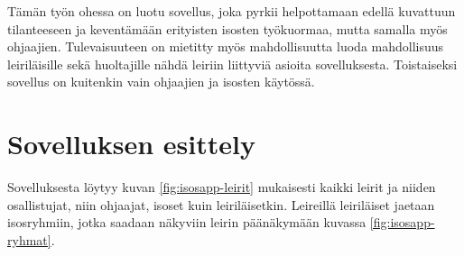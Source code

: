 Tämän työn ohessa on luotu sovellus, joka pyrkii helpottamaan edellä kuvattuun
tilanteeseen ja keventämään erityisten isosten työkuormaa, mutta samalla myös
ohjaajien. Tulevaisuuteen on mietitty myös mahdollisuutta luoda mahdollisuus
leiriläisille sekä huoltajille nähdä leiriin liittyviä asioita sovelluksesta.
Toistaiseksi sovellus on kuitenkin vain ohjaajien ja isosten käytössä.

\section{Sovelluksen esittely}

Sovelluksesta löytyy kuvan \ref{fig:isosapp-leirit} mukaisesti kaikki leirit ja
niiden osallistujat, niin ohjaajat, isoset kuin leiriläisetkin. Leireillä
leiriläiset jaetaan isosryhmiin, jotka saadaan näkyviin leirin päänäkymään
kuvassa \ref{fig:isosapp-ryhmat}.

